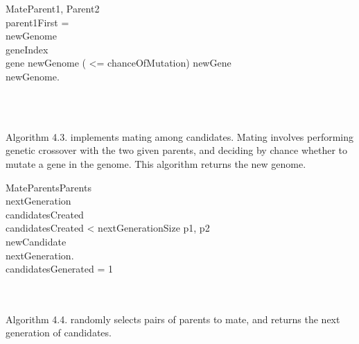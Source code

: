 \documentclass{article}
\begin{document}
\begin{pseudocode}[shadowbox]{Mate}{Parent1, Parent2} 
\\
parent1First = \\

newGenome\GETS {}\\
geneIndex\\
\FOREACH gene \in \mathcal{} newGenome \DO
\BEGIN
    \IF ( <= chanceOfMutation) \THEN \BEGIN
        newGene\GETS {}\\
        newGenome.
        
    \END
    
\END\\

\end{pseudocode}
\\
Algorithm 4.3. implements mating among candidates. Mating involves performing genetic crossover with the two given parents, and deciding by chance whether to mutate a gene in the genome. This algorithm returns the new genome.


\begin{pseudocode}[shadowbox]{MateParents}{Parents} 
\\
nextGeneration\GETS [ ]
\\ candidatesCreated\\
\WHILE candidatesCreated < nextGenerationSize \DO
    \BEGIN
    p1, p2\GETS {}\\
    newCandidate\GETS {}\\
    nextGeneration.\\
    candidatesGenerated \mathrel{+}= 1\\
    \END\\

\end{pseudocode}
\\
Algorithm 4.4. randomly selects pairs of parents to mate, and returns the next generation of candidates.

\end{document}
